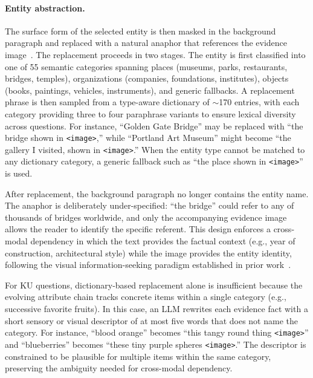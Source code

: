 \documentclass{article}
\begin{document}
\paragraph{Entity abstraction.}
The surface form of the selected entity is then masked in the background paragraph and replaced with a natural anaphor that references the evidence image~\cite{viquae,mragbench,chen2023pretrainedvisionlanguagemodels}. The replacement proceeds in two stages. The entity is first classified into one of 55 semantic categories spanning places (museums, parks, restaurants, bridges, temples), organizations (companies, foundations, institutes), objects (books, paintings, vehicles, instruments), and generic fallbacks. A replacement phrase is then sampled from a type-aware dictionary of $\sim$170 entries, with each category providing three to four paraphrase variants to ensure lexical diversity across questions. For instance, ``Golden Gate Bridge'' may be replaced with ``the bridge shown in \texttt{<image>},'' while ``Portland Art Museum'' might become ``the gallery I visited, shown in \texttt{<image>}.'' When the entity type cannot be matched to any dictionary category, a generic fallback such as ``the place shown in \texttt{<image>}'' is used.

After replacement, the background paragraph no longer contains the entity name. The anaphor is deliberately under-specified: ``the bridge'' could refer to any of thousands of bridges worldwide, and only the accompanying evidence image allows the reader to identify the specific referent. This design enforces a cross-modal dependency in which the text provides the factual context (e.g., year of construction, architectural style) while the image provides the entity identity, following the visual information-seeking paradigm established in prior work~\cite{chen2023pretrainedvisionlanguagemodels,viquae}.

For KU questions, dictionary-based replacement alone is insufficient because the evolving attribute chain tracks concrete items within a single category (e.g., successive favorite fruits). In this case, an LLM rewrites each evidence fact with a short sensory or visual descriptor of at most five words that does not name the category. For instance, ``blood orange'' becomes ``this tangy round thing \texttt{<image>}'' and ``blueberries'' becomes ``these tiny purple spheres \texttt{<image>}.'' The descriptor is constrained to be plausible for multiple items within the same category, preserving the ambiguity needed for cross-modal dependency.
\end{document}
